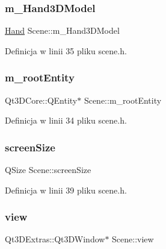 \subsubsection{\texorpdfstring{m\+\_\+\+Hand3\+D\+Model}{m\_Hand3DModel}}
{\footnotesize\ttfamily \hyperlink{class_hand}{Hand} Scene\+::m\+\_\+\+Hand3\+D\+Model\hspace{0.3cm}{\ttfamily [private]}}



Definicja w linii 35 pliku scene.\+h.

\mbox{\label{class_scene_a1ef7f61aed73e150dfb7ef7ffc47f7c2}} 
\subsubsection{\texorpdfstring{m\+\_\+root\+Entity}{m\_rootEntity}}
{\footnotesize\ttfamily Qt3\+D\+Core\+::\+Q\+Entity$\ast$ Scene\+::m\+\_\+root\+Entity\hspace{0.3cm}{\ttfamily [private]}}



Definicja w linii 34 pliku scene.\+h.

\mbox{\label{class_scene_a2bb58c1253bd4d64781a2b9e25604060}} 
\subsubsection{\texorpdfstring{screen\+Size}{screenSize}}
{\footnotesize\ttfamily Q\+Size Scene\+::screen\+Size\hspace{0.3cm}{\ttfamily [private]}}



Definicja w linii 39 pliku scene.\+h.

\mbox{\label{class_scene_a3b76fefe111a22aa56f066783fa76bc1}} 
\subsubsection{\texorpdfstring{view}{view}}
{\footnotesize\ttfamily Qt3\+D\+Extras\+::\+Qt3\+D\+Window$\ast$ Scene\+::view\hspace{0.3cm}{\ttfamily [private]}}




